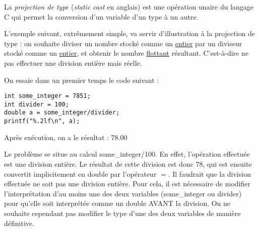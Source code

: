 \documentclass[../../../main.tex]{subfiles}
\begin{document}
La \textit{projection de type} (\textit{static cast} en anglais) est une opération unaire du langage C qui permet la conversion d'un variable d'un type à un autre.
 
L'exemple suivant, extrêmement simple, va servir d'illustration à la projection de type : on souhaite diviser un nombre stocké comme un \underline{entier} par un diviseur stocké comme un \underline{entier}, et obtenir le nombre \underline{flottant} résultant. C'est-à-dire ne pas effectuer une division entière mais réelle.
 
On essaie dans un premier temps le code suivant :
\begin{verbatim}
int some_integer = 7851;
int divider = 100;
double a = some_integer/divider;
printf("%.2lf\n", a);
\end{verbatim}
Après exécution, on a le résultat : \textsf{78.00}
 
Le problème se situe au calcul \textsf{some\_integer/100}. En effet, l'opération effectuée est une division entière. Le résultat de cette division est donc $78$, qui est ensuite convertit implicitement en \textsf{double} par l'opérateur $=$. \newline
Il faudrait que la division effectuée ne soit pas une division entière. Pour cela, il est nécessaire de modifier l'interprétation d'au moins une des deux variables (\textsf{some\_integer} ou \textsf{divider}) pour qu'elle soit interprétée comme un \textsf{double} AVANT la division. On ne souhaite cependant pas modifier le type d'une des deux variables de manière définitive.
 
\end{document}
